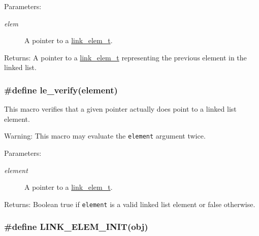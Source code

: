 \begin{Desc}
\item[Parameters:]
\begin{description}
\item[{\em elem}]A pointer to a \hyperlink{group__dbprim__link_a1}{link\_\-elem\_\-t}.\end{description}
\end{Desc}
\begin{Desc}
\item[Returns:]A pointer to a \hyperlink{group__dbprim__link_a1}{link\_\-elem\_\-t} representing the previous element in the linked list. \end{Desc}
\hypertarget{group__dbprim__link_a20}{
\subsubsection[le\_\-verify]{\setlength{\rightskip}{0pt plus 5cm}\#define le\_\-verify(element)}}
\label{group__dbprim__link_a20}


This macro verifies that a given pointer actually does point to a linked list element.

\begin{Desc}
\item[Warning:]This macro may evaluate the {\tt element} argument twice.\end{Desc}
\begin{Desc}
\item[Parameters:]
\begin{description}
\item[{\em element}]A pointer to a \hyperlink{group__dbprim__link_a1}{link\_\-elem\_\-t}.\end{description}
\end{Desc}
\begin{Desc}
\item[Returns:]Boolean true if {\tt element} is a valid linked list element or false otherwise. \end{Desc}
\hypertarget{group__dbprim__link_a19}{
\subsubsection[LINK\_\-ELEM\_\-INIT]{\setlength{\rightskip}{0pt plus 5cm}\#define LINK\_\-ELEM\_\-INIT(obj)}}
\label{group__dbprim__link_a19}


